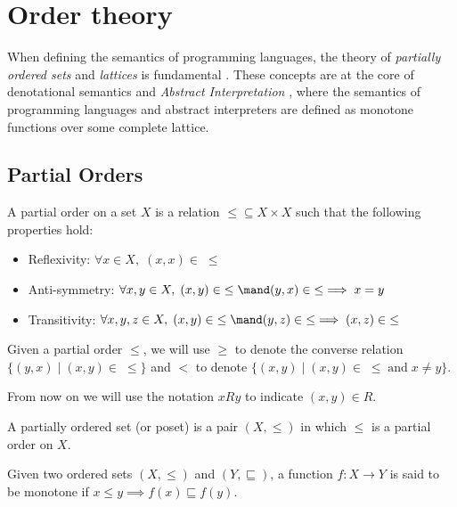 \section{Order theory}\label{sec:backround:order_theory}

When defining the semantics of programming languages, the theory of 
\textit{partially ordered sets} and \textit{lattices} is fundamental
\cite{Gratzer11, Birkhoff40}. These 
concepts are at the core of denotational semantics \cite{Scott70} and 
\textit{Abstract Interpretation} \cite{Cousot77}, where the semantics of 
programming languages and abstract interpreters are defined as monotone 
functions over some complete lattice.

\subsection{Partial Orders}

\begin{definition}
  A partial order on a set $X$ is a relation $\leq \subseteq X \times X$ 
  such that the following properties hold:
  \begin{itemize}
    \item Reflexivity: $\forall x \in X, \; (x, x) \in \; \leq$
    \item Anti-symmetry: $\forall x, y \in X, \; (x, y) \in \; \leq \mand
      (y, x) \in \; \leq \implies x = y$
    \item Transitivity: $\forall x, y, z \in X, \; (x, y) \in \; \leq \mand 
      (y, z) \in \; \leq \implies (x, z) \in \;\leq$
  \end{itemize}
    
\end{definition}

Given a partial order $\leq$, we will use $\geq$ to denote the converse 
relation $\{ (y, x) \mid (x, y) \in \;\leq \}$ and $<$ to denote 
$\{ (x, y) \mid (x, y) \in \;\leq \; \text{and} \; x \neq y \}$.

From now on we will use the notation $x R y$ to indicate $(x, y) \in R$.

\begin{definition}
  A partially ordered set (or poset) is a pair $(X, \leq)$ in which $\leq$ is a 
  partial order on $X$.
\end{definition}

\begin{definition}
  Given two ordered sets $(X, \leq)$ and $(Y, \sqsubseteq)$, a function 
  $f : X \to Y$ is said to be monotone if $x \leq y \implies f(x) \sqsubseteq 
  f(y)$.
\end{definition}


